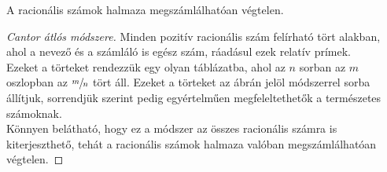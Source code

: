 \begin{theorem}
  A racionális számok halmaza megszámlálhatóan végtelen.

  \begin{proof}[Cantor átlós módszere]
    \begin{minipage}{.5\textwidth}
      Minden pozitív racionális szám felírható tört alakban, ahol a nevező és a
      számláló is egész szám, ráadásul ezek relatív prímek.
      \\[.33em]
      Ezeket a törteket rendezzük egy olyan táblázatba, ahol az $n$ sorban az
      $m$ oszlopban az $\sfrac{m}{n}$ tört áll. Ezeket a törteket az ábrán
      jelöl módszerrel sorba állítjuk, sorrendjük szerint pedig egyértelműen
      megfeleltethetők a természetes számoknak.
      \\[.33em]
      Könnyen belátható, hogy ez a módszer az összes racionális számra
      is kiterjeszthető, tehát a racionális számok halmaza valóban
      megszámlálhatóan végtelen.
    \end{minipage}\hfill%
    \begin{minipage}{.425\textwidth}
    \end{minipage}
  \end{proof}
\end{theorem}


